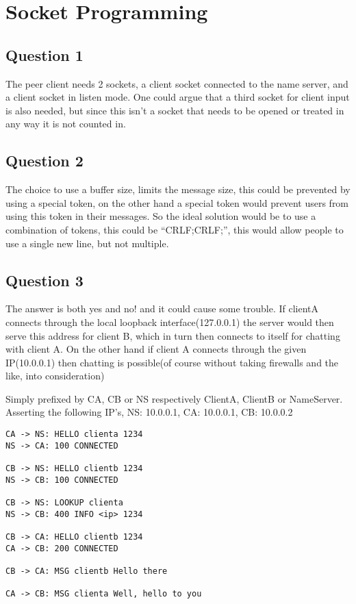 \section{Socket Programming}

\subsection{Question 1}
The peer client needs 2 sockets, a client socket connected to the name server,
and a client socket in listen mode. One could argue that a third socket for
client input is also needed, but since this isn't a socket that needs to be
opened or treated in any way it is not counted in.

\subsection{Question 2}
The choice to use a buffer size, limits the message size, this could be
prevented by using a special token, on the other hand a special token would
prevent users from using this token in their messages. So the ideal solution
would be to use a combination of tokens, this could be ``CRLF;CRLF;'', this
would allow people to use a single new line, but not multiple.

\subsection{Question 3}
The answer is both yes and no! and it could cause some trouble. If clientA
connects through the local loopback interface(127.0.0.1) the server would
then serve this address for client B, which in turn then connects to itself for
chatting with client A. On the other hand if client A connects through the
given IP(10.0.0.1) then chatting is possible(of course without taking firewalls
and the like, into consideration)

Simply prefixed by CA, CB or NS respectively ClientA, ClientB or NameServer.
Asserting the following IP's, NS: 10.0.0.1, CA: 10.0.0.1, CB: 10.0.0.2

\begin{verbatim}
CA -> NS: HELLO clienta 1234
NS -> CA: 100 CONNECTED

CB -> NS: HELLO clientb 1234
NS -> CB: 100 CONNECTED

CB -> NS: LOOKUP clienta
NS -> CB: 400 INFO <ip> 1234

CB -> CA: HELLO clientb 1234
CA -> CB: 200 CONNECTED

CB -> CA: MSG clientb Hello there

CA -> CB: MSG clienta Well, hello to you
\end{verbatim}

